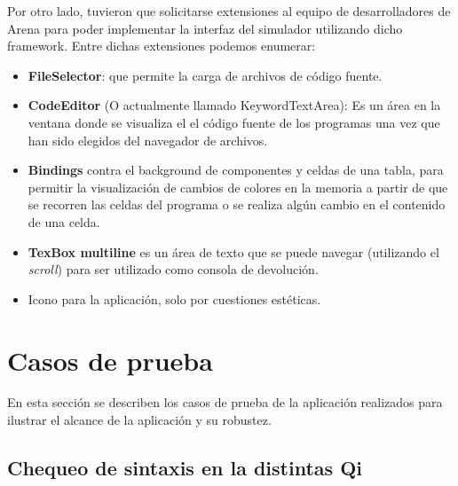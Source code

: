 Por otro lado, tuvieron que solicitarse extensiones al equipo de desarrolladores de Arena para poder implementar la interfaz del simulador utilizando dicho framework. Entre dichas extensiones podemos enumerar:

\begin{itemize}
\item \textbf{FileSelector}: que permite la carga de archivos de código fuente.
\item \textbf{CodeEditor} (O actualmente llamado KeywordTextArea): Es un área en la ventana donde se visualiza el el código fuente de los programas   una vez que han sido elegidos del navegador de archivos.
\item \textbf{Bindings} contra el background de componentes y celdas de una tabla, para permitir la visualización de cambios de colores en la memoria a partir de que se recorren las celdas del programa o se realiza algún cambio en el contenido de una celda.
\item \textbf{TexBox multiline} es un área de texto que se puede navegar (utilizando el \textit{scroll}) para ser utilizado como consola de devolución.
\item Icono para la aplicación, solo por cuestiones estéticas.
\end{itemize}

\section{Casos de prueba}

En esta sección se describen los casos de prueba de la aplicación realizados para ilustrar el alcance de la aplicación y su robustez.

\subsection{Chequeo de sintaxis en la distintas Qi}

